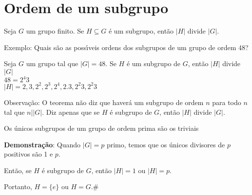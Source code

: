 \section{Ordem de um subgrupo}

\begin{teorema}[Lagrange]
Seja $G$ um grupo finito. Se $H\subseteq G$ {\'e} um subgrupo, ent{\~a}o $|H|$ divide $|G|$.
\end{teorema}

Exemplo: Quais s{\~a}o as poss{\'\i}veis ordens dos subgrupos de um grupo de ordem 48?

Seja $G$ um grupo tal que $|G|=48$. Se $H$ {\'e} um subgrupo de $G$, ent{\~a}o $|H|$ divide $|G|$\\
$48=2^{4}3$ \\
$|H|=2,3,2^{2},2^{3},2^{4},2.3,2^{2}3,2^{2}3$

Observa{\c c}{\~a}o: O teorema n{\~a}o diz que haver{\'a} um subgrupo de ordem $n$ para todo $n$ tal que $n||G|$. Diz apenas que se $H$ {\'e} subgrupo de $G$, ent{\~a}o $|H|$ divide $|G|$.

\begin{corolario}
Os {\'u}nicos subgrupos de um grupo de ordem prima s{\~a}o os triviais
\end{corolario}

\textbf{Demonstra{\c c}{\~a}o}: Quando $|G|=p$ primo, temos que os {\'u}nicos divisores de $p$ positivos s{\~a}o 1 e $p$.

Ent{\~a}o, se $H$ {\'e} subgrupo de $G$, ent{\~a}o $|H|=1$ ou $|H|=p$.

Portanto, $H=\{e\}$ ou $H=G$.\#